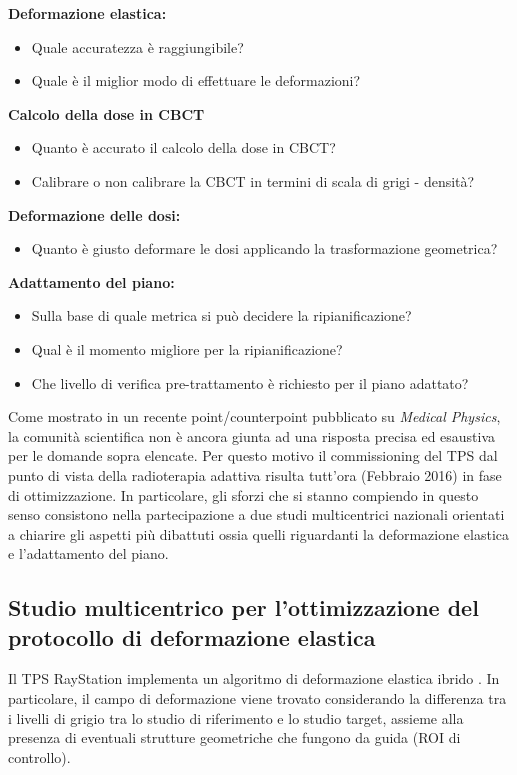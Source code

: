 \noindent\textbf{Deformazione elastica:}
\begin{itemize}
\item Quale accuratezza è raggiungibile?
\item Quale è il miglior modo di effettuare le deformazioni?
\end{itemize}
\textbf{Calcolo della dose in CBCT}
\begin{itemize}
\item Quanto è accurato il calcolo della dose in CBCT?
\item Calibrare o non calibrare la CBCT in termini di scala di grigi - densità?
\end{itemize}
\textbf{Deformazione delle dosi:}
\begin{itemize}
\item Quanto è giusto deformare le dosi applicando la trasformazione geometrica?
\end{itemize}
\textbf{Adattamento del piano:}
\begin{itemize}
\item Sulla base di quale metrica si può decidere la ripianificazione?
\item Qual è il momento migliore per la ripianificazione?
\item Che livello di verifica pre-trattamento è richiesto per il piano adattato?
\end{itemize}

Come mostrato in un recente point/counterpoint pubblicato su \textit{Medical Physics}, la comunità scientifica non è ancora giunta ad una risposta precisa ed esaustiva per le domande sopra elencate. Per questo motivo il commissioning del TPS dal punto di vista della radioterapia adattiva risulta tutt'ora (Febbraio 2016) in fase di ottimizzazione. In particolare, gli sforzi che si stanno compiendo in questo senso consistono nella partecipazione a due studi multicentrici nazionali orientati a chiarire gli aspetti più dibattuti ossia quelli riguardanti la deformazione elastica e l'adattamento del piano.

\subsection{Studio multicentrico per l'ottimizzazione del protocollo di deformazione elastica}
Il TPS RayStation implementa un algoritmo di deformazione elastica ibrido \cite{RaySearchLaboratories2014}. In particolare, il campo di deformazione viene trovato considerando la differenza tra i livelli di grigio tra lo studio di riferimento e lo studio target, assieme alla presenza di eventuali strutture geometriche che fungono da guida (ROI di controllo).

